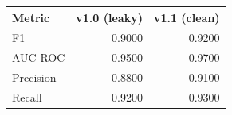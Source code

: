 \begin{tabular}{lrr}
\toprule
Metric & v1.0 (leaky) & v1.1 (clean) \\
\midrule
F1 & 0.9000 & 0.9200 \\
AUC-ROC & 0.9500 & 0.9700 \\
Precision & 0.8800 & 0.9100 \\
Recall & 0.9200 & 0.9300 \\
\bottomrule
\end{tabular}
